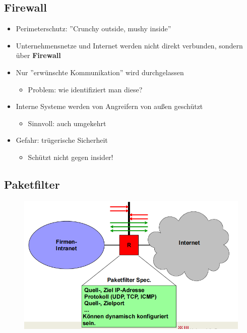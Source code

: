 \documentclass[openany]{book}
\begin{document}
\subsection{Firewall}

\begin{itemize}
    \item Perimeterschutz: ''Crunchy outside, mushy inside''
    \item Unternehmensnetze und Internet werden nicht direkt verbunden, sondern über \textbf{Firewall}
    \item Nur ''erwünschte Kommunikation'' wird durchgelassen
    \begin{itemize}
        \item Problem: wie identifiziert man diese?
    \end{itemize}
    \item Interne Systeme werden von Angreifern von außen geschützt
    \begin{itemize}
        \item Sinnvoll: auch umgekehrt
    \end{itemize}
    \item Gefahr: trügerische Sicherheit
    \begin{itemize}
        \item Schützt nicht gegen insider!
    \end{itemize}
\end{itemize}

\subsection{Paketfilter}

\begin{figure}[h!]
    \centering
    \includegraphics[width=0.85\linewidth]{Pics/PacketFilter.PNG}
\end{figure}
\end{document}
